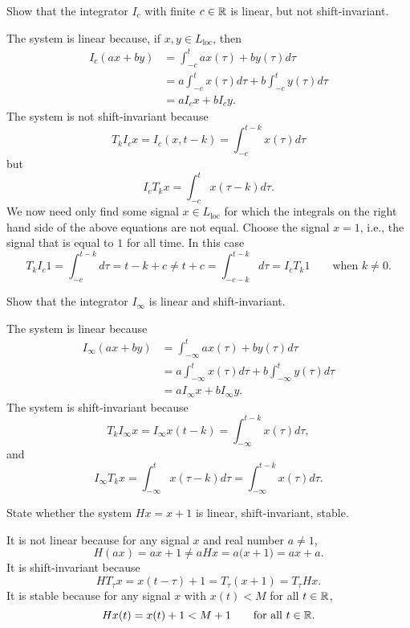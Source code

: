\begin{excersizelist}

\item Show that the integrator $I_c$ with finite $c \in {\mathbb R}$ is linear, but not shift-invariant.
\begin{solution}
The system is linear because, if $x, y \in L_{\text{loc}}$, then
\begin{align*}
I_c(ax + by) &= \int_{-c}^t ax(\tau) + b y(\tau) d\tau \\
&= a\int_{-c}^t x(\tau) d\tau + b \int_{-c}^t y(\tau) d\tau \\
&= a I_c x  + b I_c y.
\end{align*}
The system is not shift-invariant because
\[
T_k I_c x = I_c(x,t-k) = \int_{-c}^{t-k} x(\tau) d\tau 
\]
but
\[
I_c T_k x = \int_{-c}^{t} x(\tau-k) d\tau.
\]
We now need only find some signal $x \in L_{\text{loc}}$ for which the integrals on the right hand side of the above equations are not equal.  Choose the signal $x = 1$, i.e., the signal that is equal to $1$ for all time.  In this case
\[
T_k I_c 1 = \int_{-c}^{t-k} d\tau =  t-k+c \neq t + c = \int_{-c-k}^{t-k} d\tau = I_c T_k 1 \qquad \text{when $k \neq 0$.}
\]
\end{solution}

\item Show that the integrator $I_\infty$ is linear and shift-invariant.
\begin{solution}
The system is linear because
\begin{align*}
I_\infty(ax + by) &= \int_{-\infty}^t ax(\tau) + b y(\tau) d\tau \\
&= a\int_{-\infty}^t x(\tau) d\tau + b \int_{-\infty}^t y(\tau) d\tau \\
&= a I_\infty x   + b I_\infty y .
\end{align*}
The system is shift-invariant because
\[
T_k I_\infty x = I_\infty x(t-k) = \int_{-\infty}^{t-k} x(\tau) d\tau,
\]
and
\[
I_\infty T_k x = \int_{-\infty}^{t} x(\tau-k) d\tau = \int_{-\infty}^{t-k} x(\tau) d\tau.
\]
\end{solution}

\item State whether the system $H x = x + 1$ is linear, shift-invariant, stable.
\begin{solution}
It is not linear because for any signal $x$ and real number $a \neq 1$,
\[
H(ax) = ax + 1 \neq aH x = a\big( x + 1\big) = ax + a.
\]
It is shift-invariant because
\[
H T_{\tau} x  = x(t - \tau) + 1 = T_\tau(x + 1) = T_\tau H x.
\]
It is  stable because for any signal $x$ with $x(t) < M$ for all $t\in{\mathbb R}$, 
\[
Hx(t) = x(t) + 1 < M+1 \qquad \text{for all $t \in {\mathbb R}$}. 
\]
\end{solution}


\end{excersizelist}
